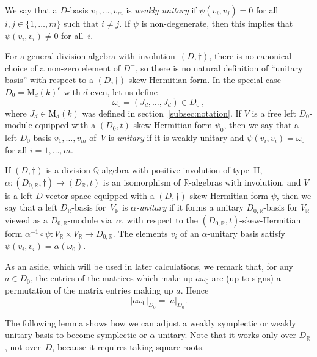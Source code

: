\documentclass[JEP,XML,SOM,Unicode,NoFloatCountersInSection]{cedram}
\newcommand{\bQ}{\mathbb{Q}}
\newcommand{\bR}{\mathbb{R}}
\newcommand{\rM}{\mathrm{M}}
\newcommand{\abs}[1]{\lvert #1 \rvert}
\newcommand{\defterm}[1]{\emph{#1}}
\begin{document}
We say that a $D$-basis $v_1, \dotsc, v_m$ is \defterm{weakly unitary} if $\psi(v_i, v_j) = 0$ for all $i, j \in \{ 1, \dotsc, m \}$ such that $i \neq j$.
If $\psi$ is non-degenerate, then this implies that $\psi(v_i, v_i) \neq 0$ for all~$i$.

For a general division algebra with involution~$(D,\dag)$, there is no canonical choice of a non-zero element of $D^-$, so there is no natural definition of ``unitary basis'' with respect to a $(D,\dag)$-skew-Hermitian form.
In the special case $D_0 = \rM_d(k)^e$ with $d$ even, let us define
\[
\omega_0 = ( J_d, \dotsc, J_d ) \in D_0^-,
\]
where $J_d \in \rM_d(k)$ was defined in section~\ref{subsec:notation}.
If $V$ is a free left $D_0$-module equipped with a $(D_0,t)$-skew-Hermitian form $\psi_0$, then we say that a left $D_0$-basis $v_1, \dotsc, v_m$ of~$V$ is \defterm{unitary} if it is weakly unitary and $\psi(v_i, v_i) = \omega_0$ for all $i = 1, \dotsc, m$.

If $(D,\dag)$ is a division $\bQ$-algebra with positive involution of type~II, $\alpha \colon (D_{0,\bR},\dag) \to (D_\bR,t)$ is an isomorphism of $\bR$-algebras with involution, and $V$ is a left $D$-vector space equipped with a $(D,\dag)$-skew-Hermitian form $\psi$, then we say that a left $D_\bR$-basis for~$V_\bR$ is \defterm{$\alpha$-unitary} if it forms a unitary $D_{0,\bR}$-basis for $V_\bR$ viewed as a $D_{0,\bR}$-module via~$\alpha$, with respect to the $(D_{0,\bR},t)$-skew-Hermitian form $\alpha^{-1} \circ \psi \colon V_\bR \times V_\bR \to D_{0,\bR}$.
The elements $v_i$ of an $\alpha$-unitary basis satisfy $\psi(v_i, v_i) = \alpha(\omega_0)$.

As an aside, which will be used in later calculations, we remark that, for any $a \in D_0$, the entries of the matrices which make up $a \omega_0$ are (up to signs) a permutation of the matrix entries making up $a$. Hence
\begin{equation} \label{eqn:a-omega0}
\abs{a\omega_0}_{D_0} = \abs{a}_{D_0}.
\end{equation}

The following lemma shows how we can adjust a weakly symplectic or weakly unitary basis to become symplectic or $\alpha$-unitary. Note that it works only over $D_\bR$, not over~$D$, because it requires taking square roots.
\end{document}
